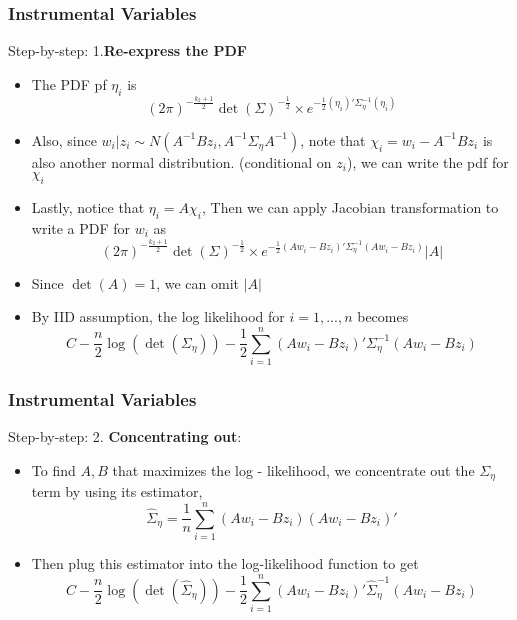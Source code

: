 \documentclass{beamer}
\begin{document}
\begin{frame}
\frametitle{Instrumental Variables}
Step-by-step: 1.\textbf{Re-express the PDF}
\begin{itemize}
\item   The PDF pf $\eta_i$ is
\[
(2\pi)^{-\frac{k_2+1}{2}}\det(\Sigma)^{-\frac{1}{2}}\times e^{-\frac{1}{2}(\eta_i)'\Sigma_\eta^{-1}(\eta_i)}
\]
\item Also, since $w_i|z_i \sim N(A^{-1}Bz_i, A^{-1}\Sigma_\eta A^{-1})$, note that $\chi_i=w_i-A^{-1}Bz_i$ is also another normal distribution. (conditional on $z_i$), we can write the pdf for $\chi_i$ 
\item Lastly, notice that $\eta_i = A\chi_i$, Then we can apply Jacobian transformation to write a PDF for $w_i$ as
\[
(2\pi)^{-\frac{k_2+1}{2}}\det(\Sigma)^{-\frac{1}{2}}\times e^{-\frac{1}{2}(Aw_i-Bz_i)'\Sigma_\eta^{-1}(Aw_i-Bz_i)}|A|
\]
\item Since $\det(A)=1$, we can omit $|A|$
\item By IID assumption, the log likelihood for $i=1,...,n$ becomes
\[
C - \frac{n}{2}\log(\det(\Sigma_\eta)) - \frac{1}{2}\sum_{i=1}^n(Aw_i-Bz_i)'\Sigma_\eta^{-1}(Aw_i-Bz_i)
\]
\end{itemize}
\end{frame}

\begin{frame}
\frametitle{Instrumental Variables}
Step-by-step: 2. \textbf{Concentrating out}:
\begin{itemize}
\item   To find $A,B$ that maximizes the log - likelihood, we concentrate out the $\Sigma_\eta$ term by using its estimator,
\[
\widehat{\Sigma}_\eta=\frac{1}{n}\sum_{i=1}^n(Aw_i-Bz_i)(Aw_i-Bz_i)'
\]
\item Then plug this estimator into the log-likelihood function to get
\[
C - \frac{n}{2}\log(\det(\widehat{\Sigma}_\eta)) - \frac{1}{2}\sum_{i=1}^n(Aw_i-Bz_i)'\widehat{\Sigma}_\eta^{-1}(Aw_i-Bz_i)
\]
\end{itemize}
\end{frame}
\end{document}
